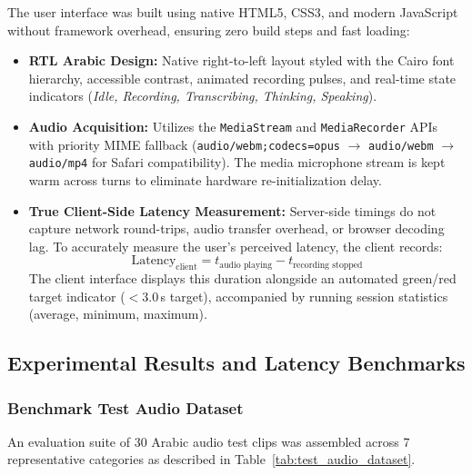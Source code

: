 The user interface was built using native HTML5, CSS3, and modern JavaScript without framework overhead, ensuring zero build steps and fast loading:
\begin{itemize}
    \item \textbf{RTL Arabic Design:} Native right-to-left layout styled with the Cairo font hierarchy, accessible contrast, animated recording pulses, and real-time state indicators (\textit{Idle, Recording, Transcribing, Thinking, Speaking}).
    \item \textbf{Audio Acquisition:} Utilizes the \texttt{MediaStream} and \texttt{MediaRecorder} APIs with priority MIME fallback (\texttt{audio/webm;codecs=opus} $\rightarrow$ \texttt{audio/webm} $\rightarrow$ \texttt{audio/mp4} for Safari compatibility). The media microphone stream is kept warm across turns to eliminate hardware re-initialization delay.
    \item \textbf{True Client-Side Latency Measurement:} Server-side timings do not capture network round-trips, audio transfer overhead, or browser decoding lag. To accurately measure the user's perceived latency, the client records:
    \begin{equation}
    \text{Latency}_{\text{client}} = t_{\text{audio playing}} - t_{\text{recording stopped}}
    \end{equation}
    The client interface displays this duration alongside an automated green/red target indicator ($< 3.0$\,s target), accompanied by running session statistics (average, minimum, maximum).
\end{itemize}

\subsection{Experimental Results and Latency Benchmarks}
\label{subsec:experimental_results}

\subsubsection{Benchmark Test Audio Dataset}
An evaluation suite of 30 Arabic audio test clips was assembled across 7 representative categories as described in Table~\ref{tab:test_audio_dataset}.

